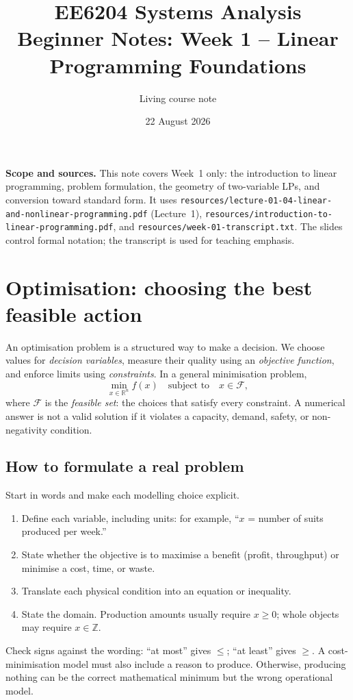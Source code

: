 \documentclass[11pt,a4paper]{article}
\title{EE6204 Systems Analysis\\\large Beginner Notes: Week 1 -- Linear Programming Foundations}
\author{Living course note}
\date{22 August 2026}
\renewcommand{\texttt}[1]{\nolinkurl{#1}}
\newcommand{\R}{\mathbb{R}}
\begin{document}
\maketitle
\noindent\textbf{Scope and sources.} This note covers Week~1 only: the introduction to linear programming, problem formulation, the geometry of two-variable LPs, and conversion toward standard form. It uses \texttt{resources/lecture-01-04-linear-and-nonlinear-programming.pdf} (Lecture~1), \texttt{resources/introduction-to-linear-programming.pdf}, and \texttt{resources/week-01-transcript.txt}. The slides control formal notation; the transcript is used for teaching emphasis.
\tableofcontents

\section{Optimisation: choosing the best feasible action}
An optimisation problem is a structured way to make a decision. We choose values for \emph{decision variables}, measure their quality using an \emph{objective function}, and enforce limits using \emph{constraints}. In a general minimisation problem,
\[
 \min_{x\in\R^n} f(x)\quad\text{subject to}\quad x\in\mathcal F,
\]
where $\mathcal F$ is the \emph{feasible set}: the choices that satisfy every constraint. A numerical answer is not a valid solution if it violates a capacity, demand, safety, or non-negativity condition.

\subsection{How to formulate a real problem}
Start in words and make each modelling choice explicit.
\begin{enumerate}
\item Define each variable, including units: for example, ``$x$ = number of suits produced per week.''
\item State whether the objective is to maximise a benefit (profit, throughput) or minimise a cost, time, or waste.
\item Translate each physical condition into an equation or inequality.
\item State the domain. Production amounts usually require $x\geq0$; whole objects may require $x\in\mathbb Z$.
\end{enumerate}
Check signs against the wording: ``at most'' gives $\leq$; ``at least'' gives $\geq$. A cost-minimisation model must also include a reason to produce. Otherwise, producing nothing can be the correct mathematical minimum but the wrong operational model.
\end{document}

